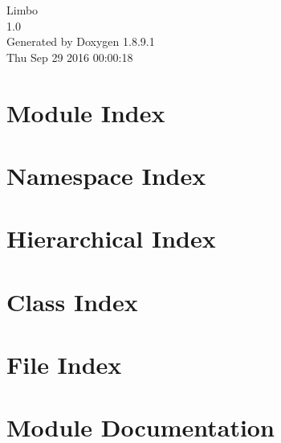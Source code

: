 \documentclass[twoside]{book}
\newcommand{\+}{\discretionary{\mbox{\scriptsize$\hookleftarrow$}}{}{}}
\newcommand{\clearemptydoublepage}{%
  \newpage{\pagestyle{empty}\cleardoublepage}%
}
\begin{document}
\hypersetup{pageanchor=false,
             bookmarks=true,
             bookmarksnumbered=true,
             pdfencoding=unicode
            }
\begin{titlepage}
\vspace*{7cm}
\begin{center}%
{\Large Limbo \\[1ex]\large 1.\+0 }\\
\vspace*{1cm}
{\large Generated by Doxygen 1.8.9.1}\\
\vspace*{0.5cm}
{\small Thu Sep 29 2016 00:00:18}\\
\end{center}
\end{titlepage}
\clearemptydoublepage
\tableofcontents
\clearemptydoublepage
{}
\hypersetup{pageanchor=true}

\chapter{Module Index}

\chapter{Namespace Index}

\chapter{Hierarchical Index}

\chapter{Class Index}

\chapter{File Index}

\chapter{Module Documentation}



















\end{document}
